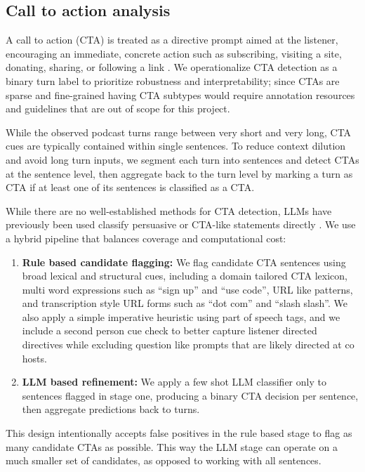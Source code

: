 \documentclass{article}
\begin{document}
\subsection{Call to action analysis}
A call to action (CTA) is treated as a directive prompt aimed at the listener, encouraging an immediate, concrete action such as subscribing, visiting a site, donating, sharing, or following a link \cite{achmanndenkler2024cta}. We operationalize CTA detection as a binary turn label to prioritize robustness and interpretability; since CTAs are sparse and fine-grained having CTA subtypes would require annotation resources and guidelines that are out of scope for this project.

While the observed podcast turns range between very short and very long, CTA cues are typically contained within single sentences. To reduce context dilution and avoid long turn inputs, we segment each turn into sentences and detect CTAs at the sentence level, then aggregate back to the turn level by marking a turn as CTA if at least one of its sentences is classified as a CTA.

While there are no well-established methods for CTA detection, LLMs have previously been used classify persuasive or CTA-like statements directly \cite{achmanndenkler2024cta}. We use a hybrid pipeline that balances coverage and computational cost:
\begin{enumerate}[leftmargin=*]
    \item \textbf{Rule based candidate flagging:} We flag candidate CTA sentences using broad lexical and structural cues, including a domain tailored CTA lexicon, multi word expressions such as ``sign up'' and ``use code'', URL like patterns, and transcription style URL forms such as ``dot com'' and ``slash slash''. We also apply a simple imperative heuristic using part of speech tags, and we include a second person cue check to better capture listener directed directives while excluding question like prompts that are likely directed at co hosts.
    \item \textbf{LLM based refinement:} We apply a few shot LLM classifier only to sentences flagged in stage one, producing a binary CTA decision per sentence, then aggregate predictions back to turns.
\end{enumerate}
This design intentionally accepts false positives in the rule based stage to flag as many candidate CTAs as possible. This way the LLM stage can operate on a much smaller set of candidates, as opposed to working with all sentences.
\end{document}
